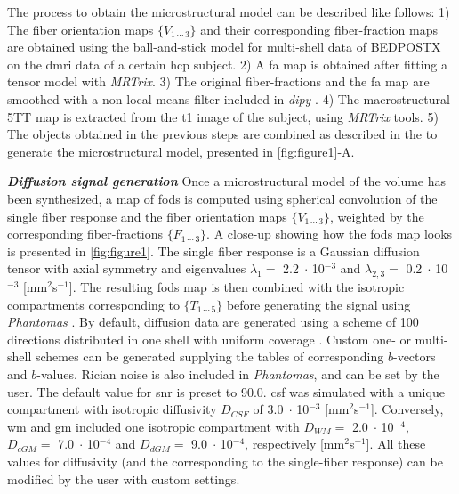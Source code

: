 \documentclass[english]{frontiers/frontiersSCNS} %
\newcommand{\e}[1]{\ensuremath{\;\cdot\,}10\ensuremath{^{#1}}}
\begin{document}
The process to obtain the microstructural model can be described like follows:
1) The fiber orientation maps $\{V_{1\,\cdots\,3}\}$ and their corresponding fiber-fraction maps are
  obtained using the ball-and-stick model for multi-shell data of BEDPOSTX \citep{jbabdi_modelbased_2012}
  on the \gls*{dmri} data of a certain \gls*{hcp} subject.
2) A \gls*{fa} map is obtained after fitting a tensor model with \emph{MRTrix}.
3) The original fiber-fractions and the \gls*{fa} map are smoothed with a non-local means filter included
  in \emph{dipy} \citep{garyfallis_dipy_2011}.
4) The macrostructural 5TT map is extracted from the \acrlong*{t1} image of the subject, using \emph{MRTrix} tools.
5) The objects obtained in the previous steps are combined as described in the  to generate the
  microstructural model, presented in \autoref{fig:figure1}-A.

\noindent\textbf{\textit{Diffusion signal generation\textcolon}\label{sec:data_dwi}} %
Once a microstructural model of the volume has been synthesized, a map of \glspl{fod} is computed using spherical
  convolution of the single fiber response and the fiber orientation maps $\{V_{1\,\cdots\,3}\}$, weighted by the
  corresponding fiber-fractions $\{F_{1\,\cdots\,3}\}$.
A close-up showing how the \glspl{fod} map looks is presented in \autoref{fig:figure1}.
The single fiber response is a Gaussian diffusion tensor with axial symmetry and eigenvalues $\lambda_1=$ 2.2\e{-3}
  and $\lambda_{2,3}=$ 0.2\e{-3} [mm$^2$s$^{-1}$].
The resulting \glspl{fod} map is then combined with the isotropic compartments corresponding to $\{T_{1\,\cdots\,5}\}$
  before generating the signal using \emph{Phantomas} \citep{caruyer_phantomas_2014}.
By default, diffusion data are generated using a scheme of 100 directions distributed in one shell with uniform
  coverage \citep{caruyer_design_2013}.
Custom one- or multi-shell schemes can be generated supplying the tables of corresponding $b$-vectors and $b$-values.
Rician noise is also included in \emph{Phantomas}, and can be set by the user.
The default value for \gls*{snr} is preset to 90.0.
\Gls*{csf} was simulated with a unique compartment with isotropic diffusivity $D_{CSF}$ of 3.0\e{-3} [mm$^2$s$^{-1}$].
Conversely, \Gls*{wm} and \gls*{gm} included one isotropic compartment with $D_{WM} =$ 2.0\e{-4}, $D_{cGM} =$ 7.0\e{-4}
  and $D_{dGM} =$ 9.0\e{-4}, respectively [mm$^2$s$^{-1}$].
All these values for diffusivity (and the corresponding to the single-fiber response) can be modified by the user with
  custom settings.
\end{document}
